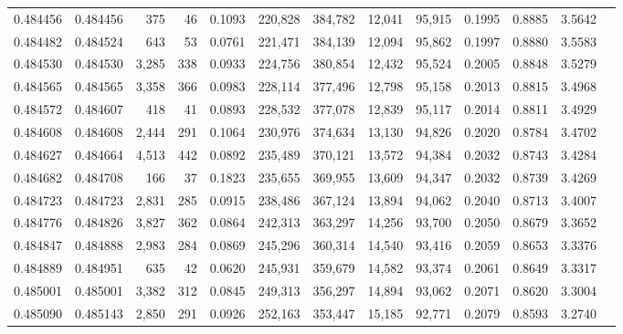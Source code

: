 \begin{tabular}{rrrrrrrrrrrrr}
0.484456 & 0.484456 &   375 &    46 &                                     0.1093 & 220,828 & 384,782 &  12,041 &  95,915 & 0.1995 & 0.8885 & 3.5642 \\
0.484482 & 0.484524 &   643 &    53 &                                     0.0761 & 221,471 & 384,139 &  12,094 &  95,862 & 0.1997 & 0.8880 & 3.5583 \\
0.484530 & 0.484530 & 3,285 &   338 &                                     0.0933 & 224,756 & 380,854 &  12,432 &  95,524 & 0.2005 & 0.8848 & 3.5279 \\
0.484565 & 0.484565 & 3,358 &   366 &                                     0.0983 & 228,114 & 377,496 &  12,798 &  95,158 & 0.2013 & 0.8815 & 3.4968 \\
0.484572 & 0.484607 &   418 &    41 &                                     0.0893 & 228,532 & 377,078 &  12,839 &  95,117 & 0.2014 & 0.8811 & 3.4929 \\
0.484608 & 0.484608 & 2,444 &   291 &                                     0.1064 & 230,976 & 374,634 &  13,130 &  94,826 & 0.2020 & 0.8784 & 3.4702 \\
0.484627 & 0.484664 & 4,513 &   442 &                                     0.0892 & 235,489 & 370,121 &  13,572 &  94,384 & 0.2032 & 0.8743 & 3.4284 \\
0.484682 & 0.484708 &   166 &    37 &                                     0.1823 & 235,655 & 369,955 &  13,609 &  94,347 & 0.2032 & 0.8739 & 3.4269 \\
0.484723 & 0.484723 & 2,831 &   285 &                                     0.0915 & 238,486 & 367,124 &  13,894 &  94,062 & 0.2040 & 0.8713 & 3.4007 \\
0.484776 & 0.484826 & 3,827 &   362 &                                     0.0864 & 242,313 & 363,297 &  14,256 &  93,700 & 0.2050 & 0.8679 & 3.3652 \\
0.484847 & 0.484888 & 2,983 &   284 &                                     0.0869 & 245,296 & 360,314 &  14,540 &  93,416 & 0.2059 & 0.8653 & 3.3376 \\
0.484889 & 0.484951 &   635 &    42 &                                     0.0620 & 245,931 & 359,679 &  14,582 &  93,374 & 0.2061 & 0.8649 & 3.3317 \\
0.485001 & 0.485001 & 3,382 &   312 &                                     0.0845 & 249,313 & 356,297 &  14,894 &  93,062 & 0.2071 & 0.8620 & 3.3004 \\
0.485090 & 0.485143 & 2,850 &   291 &                                     0.0926 & 252,163 & 353,447 &  15,185 &  92,771 & 0.2079 & 0.8593 & 3.2740 \\

\end{tabular}
